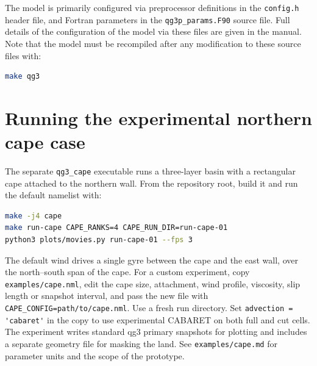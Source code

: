 \documentclass[a4paper]{article}
\begin{document}
The model is primarily configured via preprocessor definitions in the
\verb+config.h+ header file, and Fortran parameters in the
\verb+qg3p_params.F90+ source file. Full details of the configuration of the
model via these files are given in the manual. Note that the model must be
recompiled after any modification to these source files with:
\begin{lstlisting}[language = bash, frame = single]
make qg3
\end{lstlisting}

\section{Running the experimental northern cape case}

The separate \verb+qg3_cape+ executable runs a three-layer basin with a
rectangular cape attached to the northern wall. From the repository root,
build it and run the default namelist with:
\begin{lstlisting}[language = bash, frame = single]
make -j4 cape
make run-cape CAPE_RANKS=4 CAPE_RUN_DIR=run-cape-01
python3 plots/movies.py run-cape-01 --fps 3
\end{lstlisting}
The default wind drives a single gyre between the cape and the east wall,
over the north--south span of the cape.
For a custom experiment, copy \verb+examples/cape.nml+, edit the cape size,
attachment, wind profile, viscosity, slip length or snapshot interval, and
pass the new file with \verb+CAPE_CONFIG=path/to/cape.nml+. Use a fresh run
directory. Set \verb+advection = 'cabaret'+ in the copy to use experimental
CABARET on both full and cut cells. The experiment writes standard qg3 primary snapshots for plotting
and includes a separate geometry file for masking the land. See
\verb+examples/cape.md+ for parameter units and the scope of the prototype.

%
%
\end{document}
